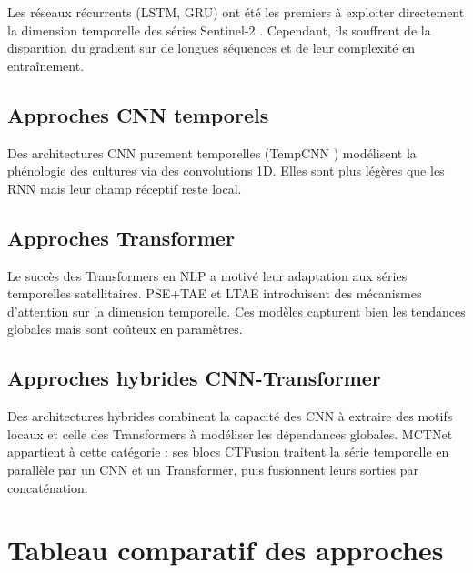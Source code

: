Les réseaux récurrents (LSTM, GRU) ont été les premiers à exploiter
directement la dimension temporelle des séries Sentinel-2 \cite{russwurm2018}.
Cependant, ils souffrent de la disparition du gradient sur de longues
séquences et de leur complexité en entraînement.

\subsection{Approches CNN temporels}

Des architectures CNN purement temporelles (TempCNN \cite{pelletier2019})
modélisent la phénologie des cultures via des convolutions 1D. Elles sont
plus légères que les RNN mais leur champ réceptif reste local.

\subsection{Approches Transformer}

Le succès des Transformers en NLP a motivé leur adaptation aux séries
temporelles satellitaires. PSE+TAE \cite{garnot2021} et LTAE introduisent
des mécanismes d'attention sur la dimension temporelle. Ces modèles
capturent bien les tendances globales mais sont coûteux en paramètres.

\subsection{Approches hybrides CNN-Transformer}

Des architectures hybrides combinent la capacité des CNN à extraire des
motifs locaux et celle des Transformers à modéliser les dépendances globales.
MCTNet \cite{wang2024} appartient à cette catégorie : ses blocs CTFusion
traitent la série temporelle en parallèle par un CNN et un Transformer, puis
fusionnent leurs sorties par concaténation.

\section{Tableau comparatif des approches}

